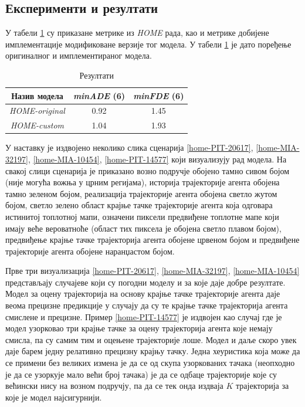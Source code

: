 \documentclass[11pt,oneside]{memoir}
\begin{document}
\subsection{Експерименти и резултати}

У табели \ref{heatmap-results} су приказане метрике из \textit{HOME} \cite{home} рада, као и метрике добијене
имплементације модификоване верзије тог модела. У табели
\ref{heatmap-results} је дато поређење оригиналног и имплементираног модела.

\begin{table}[H]
  \centering
  \begin{tabular}{c|c|c}
    Назив модела & \textit{minADE} (6) & \textit{minFDE} (6) \\
    \hline
    \textit{HOME-original} & 0.92 & 1.45 \\
    \textit{HOME-custom} & 1.04 & 1.93 \\
  \end{tabular}
  \caption{Резултати}
  \label{heatmap-results}
\end{table}

У наставку је издвојено неколико слика сценарија \ref{home-PIT-20617}, \ref{home-MIA-32197}, \ref{home-MIA-10454}, \ref{home-PIT-14577} 
који визуализују рад модела. На свакој слици сценарија је приказано возно подручје обојено тамно сивом бојом (није могућа вожња
у црним регијама), историја трајекторије агента обојена тамно зеленом бојом, реализација трајекторије агента обојена светло жутом бојом,
светло зелено област крајње тачке трајекторије агента која одговара истинитој топлотној мапи, означени пиксели предвиђене топлотне мапе
који имају веће вероватноће (област тих пиксела је обојена светло плавом бојом), предвиђење крајње тачке трајекторија агента
обојене црвеном бојом и предвиђене трајекторије агента обојене наранџастом бојом.

Прве три визуализација \ref{home-PIT-20617}, \ref{home-MIA-32197}, \ref{home-MIA-10454} представљају случајеве који су погодни моделу
и за које даје добре резултате. Модел за оцену трајекторија на основу крајње тачке трајекторије агента даје веома прецизне
предикције у случају да су те крајње тачке трајекторија агента смислене и прецизне. Пример \ref{home-PIT-14577} је издвојен као случај
где је модел узорковао три крајње тачке за оцену трајекторија агента које немају смисла, па су самим тим и оцењене трајекторије лоше.
Модел и даље скоро увек даје барем једну релативно прецизну крајњу тачку. Једна хеуристика која може да се примени без великих измена је да
се од скупа узоркованих тачака (неопходно је да се узоркује мало већи број тачака) је да се одбаце трајекторије које су већински нису на возном
подручју, па да се тек онда издваја $K$ трајекторија за које је модел најсигурнији.
\end{document}
